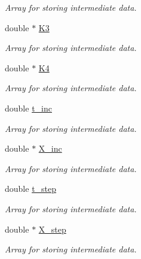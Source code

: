 \begin{DoxyCompactItemize}
\begin{DoxyCompactList}\small\item\em Array for storing intermediate data. \end{DoxyCompactList}\item 
\hypertarget{structrk4_aa0a71aaaedac1ab7b3e03be4604e1845}{}double $\ast$ \hyperlink{structrk4_aa0a71aaaedac1ab7b3e03be4604e1845}{K3}\label{structrk4_aa0a71aaaedac1ab7b3e03be4604e1845}

\begin{DoxyCompactList}\small\item\em Array for storing intermediate data. \end{DoxyCompactList}\item 
\hypertarget{structrk4_af94017f53b4c629e055a14f8c48572dd}{}double $\ast$ \hyperlink{structrk4_af94017f53b4c629e055a14f8c48572dd}{K4}\label{structrk4_af94017f53b4c629e055a14f8c48572dd}

\begin{DoxyCompactList}\small\item\em Array for storing intermediate data. \end{DoxyCompactList}\item 
\hypertarget{structrk4_ab4c880c62f39a795976c2b0746accfa0}{}double \hyperlink{structrk4_ab4c880c62f39a795976c2b0746accfa0}{t\+\_\+inc}\label{structrk4_ab4c880c62f39a795976c2b0746accfa0}

\begin{DoxyCompactList}\small\item\em Array for storing intermediate data. \end{DoxyCompactList}\item 
\hypertarget{structrk4_add018b35c5fce3c60568f5f417247fba}{}double $\ast$ \hyperlink{structrk4_add018b35c5fce3c60568f5f417247fba}{X\+\_\+inc}\label{structrk4_add018b35c5fce3c60568f5f417247fba}

\begin{DoxyCompactList}\small\item\em Array for storing intermediate data. \end{DoxyCompactList}\item 
\hypertarget{structrk4_a1cd740ec71a9b29db5f7e66977e3f141}{}double \hyperlink{structrk4_a1cd740ec71a9b29db5f7e66977e3f141}{t\+\_\+step}\label{structrk4_a1cd740ec71a9b29db5f7e66977e3f141}

\begin{DoxyCompactList}\small\item\em Array for storing intermediate data. \end{DoxyCompactList}\item 
\hypertarget{structrk4_aad92411111f3087775236a631b4ede78}{}double $\ast$ \hyperlink{structrk4_aad92411111f3087775236a631b4ede78}{X\+\_\+step}\label{structrk4_aad92411111f3087775236a631b4ede78}

\begin{DoxyCompactList}\small\item\em Array for storing intermediate data. \end{DoxyCompactList}\end{DoxyCompactItemize}


